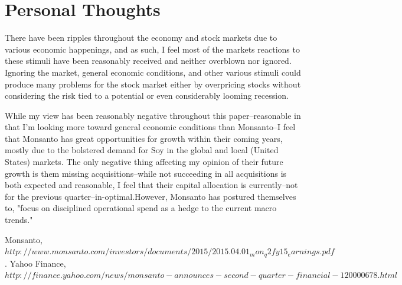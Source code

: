 \documentclass[11pt,letterpaper,english]{article}
\newcommand{\newpar}{\vspace{10mm}\noindent}
\begin{document}
\section{Personal Thoughts}
There have been ripples throughout the economy and stock markets due to various economic happenings, and as such, I feel most of the markets reactions to these stimuli have been reasonably received and neither overblown nor ignored. Ignoring the market, general economic conditions, and other various stimuli could produce many problems for the stock market either by overpricing stocks without considering the risk tied to a potential or even considerably looming recession. 

\newpar
While my view has been reasonably negative throughout this paper--reasonable in that I'm looking more toward general economic conditions than Monsanto--I feel that Monsanto has great opportunities for growth within their coming years, mostly due to the bolstered demand for Soy in the global and local (United States) markets. The only negative thing affecting my opinion of their future growth is them missing acquisitions--while not succeeding in all acquisitions is both expected and reasonable, I feel that their capital allocation is currently--not for the previous quarter--in-optimal.However, Monsanto has postured themselves to, "focus on disciplined operational spend as a hedge to the current macro trends."

\newpage
\begin{thebibliography}{9}
    Monsanto,
    \emph{$http://www.monsanto.com/investors/documents/2015/2015.04.01_mon_q2fy15_earnings.pdf$}.
     Yahoo Finance,
     \emph{$http://finance.yahoo.com/news/monsanto-announces-second-quarter-financial-120000678.html$}
\end{thebibliography}
\end{document}
